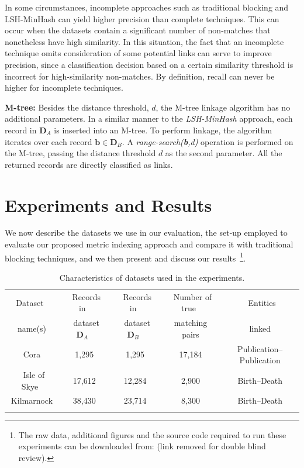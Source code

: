 \documentclass{llncs}
\begin{document}
In some circumstances, incomplete approaches such as traditional
blocking and LSH-MinHash can yield higher precision than complete
techniques. This can occur when the datasets contain a significant
number of non-matches that nonetheless have high similarity. In this
situation, the fact that an incomplete technique omits consideration
of some potential links can serve to improve precision, since a
classification decision based on a certain similarity threshold is
incorrect for high-similarity non-matches. By definition, recall can
never be higher for incomplete techniques.

\smallskip
\textbf{M-tree:} Besides the distance threshold, $d$, the M-tree
linkage algorithm has no additional parameters. In a similar manner
to the \emph{LSH-MinHash} approach, each record in $\mathbf{D}_A$ is inserted into an M-tree. To perform linkage, the algorithm iterates
over each record $\mathbf{b} \in \mathbf{D}_B$. A
\emph{range-search(\textbf{b},d)} operation is performed on the
M-tree, passing the distance threshold $d$ as the second parameter.
All the returned records are directly classified as links.


\section{Experiments and Results}
\label{sec-exp}

We now describe the datasets we use in our evaluation, the set-up
employed to evaluate our proposed metric indexing approach and compare
it with traditional blocking techniques, and we then present and discuss
our results~\footnote{The raw data, additional figures and the source
code required to run these experiments can be downloaded from:
(link removed for double blind review).}.


\begin{table}[t]
\caption{Characteristics of datasets used in the experiments.}
 \label{table-datasets}
  \centering
  \begin{scriptsize}
  \begin{tabular}{ccccc}
  \hline\noalign{\smallskip}
  Dataset~ & ~Records in~& ~Records in~ & ~Number of true~& ~Entities \\
    name(s)  & ~dataset $\mathbf{D}_A$~ & ~dataset $\mathbf{D}_B$~ &
    matching pairs & linked \\
  \noalign{\smallskip} \hline \noalign{\smallskip}
  Cora & 1,295 & 1,295 & 17,184 & Publication--Publication\\
  ~Isle of Skye~ & 17,612 & 12,284& 2,900 & Birth--Death \\
  Kilmarnock & ~38,430~ & ~23,714~ & ~8,300~ & ~Birth--Death~ \\
  \noalign{\smallskip} \hline
  \end{tabular}
  \end{scriptsize}
\end{table}
\end{document}
